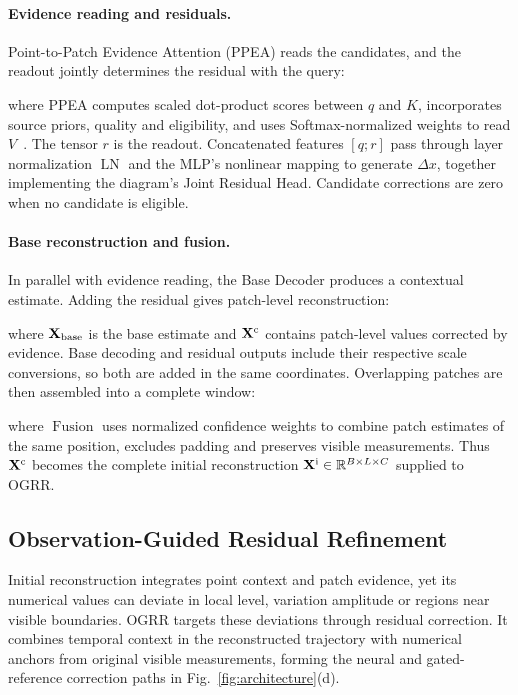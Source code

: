\paragraph{Evidence reading and residuals.}
Point-to-Patch Evidence Attention (PPEA) reads the candidates, and the readout jointly determines the residual with the query:

where PPEA computes scaled dot-product scores between $q$ and $K$, incorporates source priors, quality and eligibility, and uses Softmax-normalized weights to read $V$~\citep{attention}. The tensor $r$ is the readout. Concatenated features $[q;r]$ pass through layer normalization $\operatorname{LN}$ and the MLP's nonlinear mapping to generate $\Delta x$, together implementing the diagram's Joint Residual Head. Candidate corrections are zero when no candidate is eligible.

\paragraph{Base reconstruction and fusion.}
In parallel with evidence reading, the Base Decoder produces a contextual estimate. Adding the residual gives patch-level reconstruction:

where $\mathbf{X}_{\rm base}$ is the base estimate and $\mathbf{X}^{\rm c}$ contains patch-level values corrected by evidence. Base decoding and residual outputs include their respective scale conversions, so both are added in the same coordinates. Overlapping patches are then assembled into a complete window:

where $\operatorname{Fusion}$ uses normalized confidence weights to combine patch estimates of the same position, excludes padding and preserves visible measurements. Thus $\mathbf{X}^{\rm c}$ becomes the complete initial reconstruction $\mathbf{X}^{\rm i}\in\mathbb R^{B\times L\times C}$ supplied to OGRR.

\subsection{Observation-Guided Residual Refinement}\label{sec:ogrr}
Initial reconstruction integrates point context and patch evidence, yet its numerical values can deviate in local level, variation amplitude or regions near visible boundaries. OGRR targets these deviations through residual correction. It combines temporal context in the reconstructed trajectory with numerical anchors from original visible measurements, forming the neural and gated-reference correction paths in Fig.~\ref{fig:architecture}(d).

